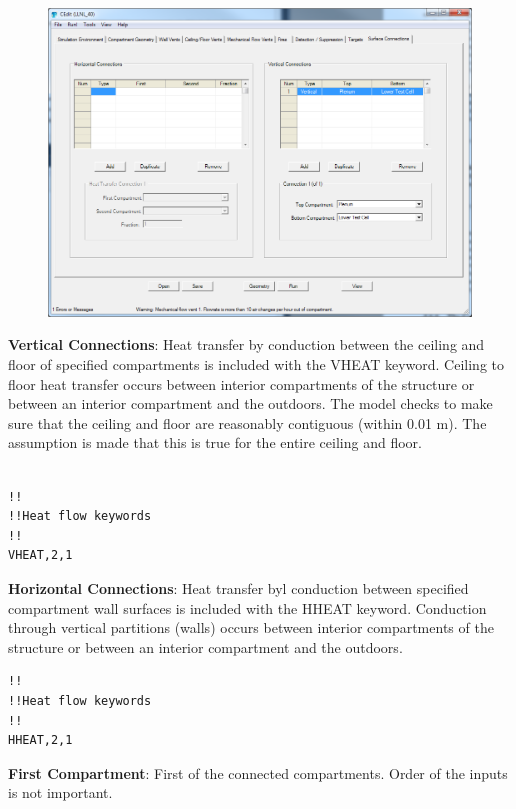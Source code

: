 \begin{figure}[h!]
\begin{center}
\includegraphics[width=6.5in]{FIGURES/Input_File/Surface_Connection_Tab}
\end{center}
\end{figure}

\textbf{Vertical Connections}: Heat transfer by conduction  between the ceiling and floor of specified compartments is included with the VHEAT keyword. Ceiling to floor heat transfer occurs between interior compartments of the structure or between an interior compartment and the outdoors. The model checks to make sure that the ceiling and floor are reasonably contiguous (within 0.01 m).  The assumption is made that this is true for the entire ceiling and floor. \\~ \\

\begin{lstlisting}
!!
!!Heat flow keywords
!!
VHEAT,2,1
\end{lstlisting}

\textbf{Horizontal Connections}: Heat transfer byl conduction between specified compartment wall surfaces is included with the HHEAT keyword.  Conduction through vertical partitions (walls) occurs between interior compartments of the structure or between an interior compartment and the outdoors.

\begin{lstlisting}
!!
!!Heat flow keywords
!!
HHEAT,2,1
\end{lstlisting}

\textbf{First Compartment}: First of the connected compartments. Order of the inputs is not important.


